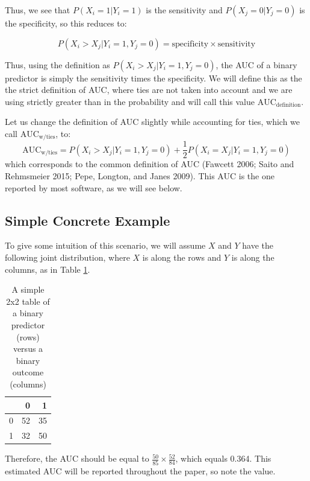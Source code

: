 \documentclass[smallextended]{svjour3}       %
\begin{document}
Thus, we see that \(P(X_{i} =1 | Y_{i} = 1)\) is the sensitivity and
\(P(X_{j} =0 | Y_{j} = 0)\) is the specificity, so this reduces to:

\begin{equation}
P(X_{i} > X_{j} | Y_{i} = 1, Y_{j} = 0) = \text{specificity} \times \text{sensitivity} \label{eq:expand}
\end{equation}

Thus, using the definition as
\(P(X_{i} > X_{j} | Y_{i} = 1, Y_{j} = 0)\), the AUC of a binary
predictor is simply the sensitivity times the specificity. We will
define this as the the strict definition of AUC, where ties are not
taken into account and we are using strictly greater than in the
probability and will call this value \(\text{AUC}_{\text{definition}}\).

Let us change the definition of AUC slightly while accounting for ties,
which we call \(\text{AUC}_{\text{w/ties}}\), to: \[
\text{AUC}_{\text{w/ties}} = P(X_{i} > X_{j} | Y_{i} = 1, Y_{j} = 0) + \frac{1}{2} P(X_{i} = X_{j} | Y_{i} = 1, Y_{j} = 0)
\] which corresponds to the common definition of AUC (Fawcett 2006;
Saito and Rehmsmeier 2015; Pepe, Longton, and Janes 2009). This AUC is
the one reported by most software, as we will see below.

\hypertarget{simple-concrete-example}{%
\subsection{Simple Concrete Example}\label{simple-concrete-example}}

To give some intuition of this scenario, we will assume \(X\) and \(Y\)
have the following joint distribution, where \(X\) is along the rows and
\(Y\) is along the columns, as in Table \ref{tab:create_tab}.

\begin{table}[ht]

\caption{\label{tab:create_tab}A simple 2x2 table of a binary predictor (rows) versus a binary outcome (columns)}
\centering
\begin{tabular}{l|r|r}
\hline
  & 0 & 1\\
\hline
0 & 52 & 35\\
\hline
1 & 32 & 50\\
\hline
\end{tabular}
\end{table}

Therefore, the AUC should be equal to
\(\frac{50}{85} \times \frac{52}{84}\), which equals 0.364. This
estimated AUC will be reported throughout the paper, so note the value.
\end{document}
